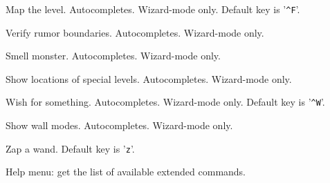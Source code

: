Map the level. Autocompletes. Wizard-mode only. Default key is '{\tt \^{}F}'.
\item[\tb{\#wizrumorcheck}]
Verify rumor boundaries. Autocompletes. Wizard-mode only.
\item[\tb{\#wizsmell}]
Smell monster. Autocompletes. Wizard-mode only.
\item[\tb{\#wizwhere}]
Show locations of special levels. Autocompletes. Wizard-mode only.
\item[\tb{\#wizwish}]
Wish for something. Autocompletes. Wizard-mode only. Default key is '{\tt \^{}W}'.
\item[\tb{\#wmode}]
Show wall modes. Autocompletes. Wizard-mode only.
\item[\tb{\#zap}]
Zap a wand. Default key is '{\tt z}'.
\item[\tb{\#?}]
Help menu:  get the list of available extended commands.
\elist

